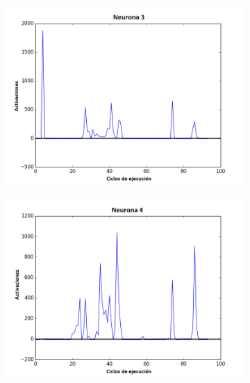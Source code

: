 \begin{figure}[!h]
\begin{subfigure}{0.33\textwidth}
  \includegraphics[width=\linewidth]{Imagenes/Agente2Activaciones/Agente1/Neurona2}
\end{subfigure}
\medskip
\begin{subfigure}{0.33\textwidth}
  \includegraphics[width=\linewidth]{Imagenes/Agente2Activaciones/Agente1/Neurona3}
\end{subfigure}\hfil %
\begin{subfigure}{0.33\textwidth}

\end{subfigure}
\end{figure}
